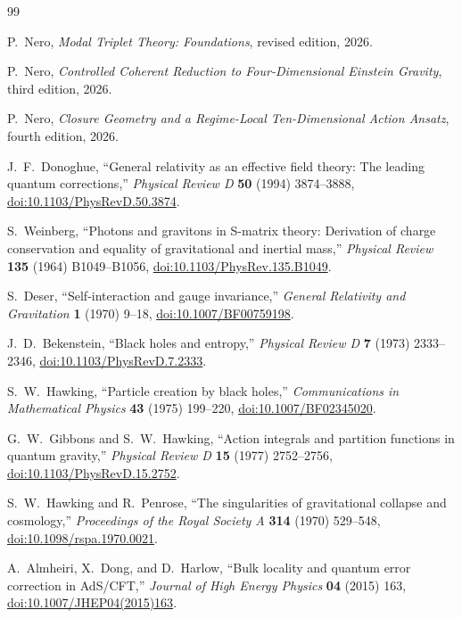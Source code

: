 \documentclass[11pt]{article}
\begin{document}
\begin{thebibliography}{99}

P.~Nero,
\emph{Modal Triplet Theory: Foundations},
revised edition, 2026.

P.~Nero,
\emph{Controlled Coherent Reduction to Four-Dimensional Einstein Gravity},
third edition, 2026.

P.~Nero,
\emph{Closure Geometry and a Regime-Local Ten-Dimensional Action Ansatz},
fourth edition, 2026.

J.~F.~Donoghue,
``General relativity as an effective field theory: The leading quantum
corrections,''
\emph{Physical Review D} \textbf{50} (1994) 3874--3888,
\href{https://doi.org/10.1103/PhysRevD.50.3874}
{doi:10.1103/PhysRevD.50.3874}.

S.~Weinberg,
``Photons and gravitons in S-matrix theory: Derivation of charge conservation
and equality of gravitational and inertial mass,''
\emph{Physical Review} \textbf{135} (1964) B1049--B1056,
\href{https://doi.org/10.1103/PhysRev.135.B1049}
{doi:10.1103/PhysRev.135.B1049}.

S.~Deser,
``Self-interaction and gauge invariance,''
\emph{General Relativity and Gravitation} \textbf{1} (1970) 9--18,
\href{https://doi.org/10.1007/BF00759198}
{doi:10.1007/BF00759198}.

J.~D.~Bekenstein,
``Black holes and entropy,''
\emph{Physical Review D} \textbf{7} (1973) 2333--2346,
\href{https://doi.org/10.1103/PhysRevD.7.2333}
{doi:10.1103/PhysRevD.7.2333}.

S.~W.~Hawking,
``Particle creation by black holes,''
\emph{Communications in Mathematical Physics} \textbf{43} (1975) 199--220,
\href{https://doi.org/10.1007/BF02345020}
{doi:10.1007/BF02345020}.

G.~W.~Gibbons and S.~W.~Hawking,
``Action integrals and partition functions in quantum gravity,''
\emph{Physical Review D} \textbf{15} (1977) 2752--2756,
\href{https://doi.org/10.1103/PhysRevD.15.2752}
{doi:10.1103/PhysRevD.15.2752}.

S.~W.~Hawking and R.~Penrose,
``The singularities of gravitational collapse and cosmology,''
\emph{Proceedings of the Royal Society A} \textbf{314} (1970) 529--548,
\href{https://doi.org/10.1098/rspa.1970.0021}
{doi:10.1098/rspa.1970.0021}.

A.~Almheiri, X.~Dong, and D.~Harlow,
``Bulk locality and quantum error correction in AdS/CFT,''
\emph{Journal of High Energy Physics} \textbf{04} (2015) 163,
\href{https://doi.org/10.1007/JHEP04(2015)163}
{doi:10.1007/JHEP04(2015)163}.

\end{thebibliography}
\end{document}
